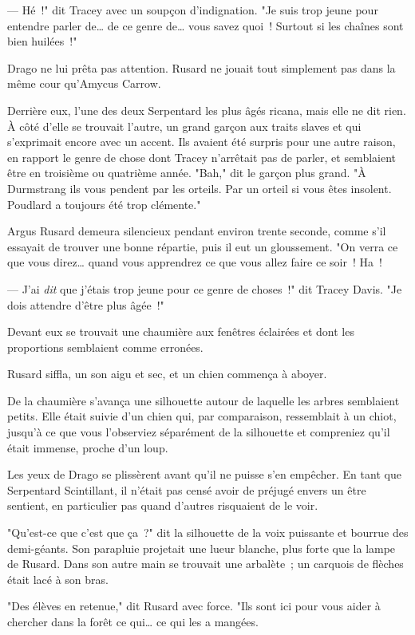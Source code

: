 --- Hé~!" dit Tracey avec un soupçon d'indignation. "Je suis trop jeune pour entendre parler de… de ce genre de… vous savez quoi~! Surtout si les chaînes sont bien huilées~!"

Drago ne lui prêta pas attention. Rusard ne jouait tout simplement pas dans la même cour qu'Amycus Carrow.

Derrière eux, l'une des deux Serpentard les plus âgés ricana, mais elle ne dit rien. À côté d'elle se trouvait l'autre, un grand garçon aux traits slaves et qui s'exprimait encore avec un accent. Ils avaient été surpris pour une autre raison, en rapport le genre de chose dont Tracey n'arrêtait pas de parler, et semblaient être en troisième ou quatrième année. "Bah," dit le garçon plus grand. "À Durmstrang ils vous pendent par les orteils. Par un orteil si vous êtes insolent. Poudlard a toujours été trop clémente."

Argus Rusard demeura silencieux pendant environ trente seconde, comme s'il essayait de trouver une bonne répartie, puis il eut un gloussement. "On verra ce que vous direz… quand vous apprendrez ce que vous allez faire ce soir~! Ha~!

--- J'ai \emph{dit} que j'étais trop jeune pour ce genre de choses~!" dit Tracey Davis. "Je dois attendre d'être plus âgée~!"

Devant eux se trouvait une chaumière aux fenêtres éclairées et dont les proportions semblaient comme erronées.

Rusard siffla, un son aigu et sec, et un chien commença à aboyer.

De la chaumière s'avança une silhouette autour de laquelle les arbres semblaient petits. Elle était suivie d'un chien qui, par comparaison, ressemblait à un chiot, jusqu'à ce que vous l'observiez séparément de la silhouette et compreniez qu'il était immense, proche d'un loup.

Les yeux de Drago se plissèrent avant qu'il ne puisse s'en empêcher. En tant que Serpentard Scintillant, il n'était pas censé avoir de préjugé envers un être sentient, en particulier pas quand d'autres risquaient de le voir.

"Qu'est-ce que c'est que ça~?" dit la silhouette de la voix puissante et bourrue des demi-géants. Son parapluie projetait une lueur blanche, plus forte que la lampe de Rusard. Dans son autre main se trouvait une arbalète~; un carquois de flèches était lacé à son bras.

"Des élèves en retenue," dit Rusard avec force. "Ils sont ici pour vous aider à chercher dans la forêt ce qui… ce qui les a mangées.

